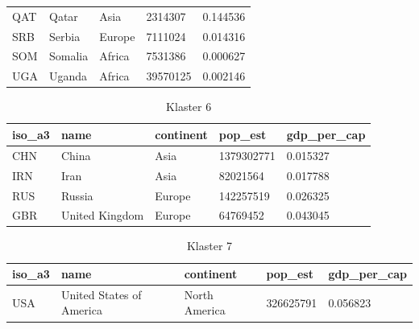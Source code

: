 \documentclass[11pt]{report}
\begin{document}
\begin{table}[]
\begin{tabular}{lllll}
            QAT                           & Qatar                     & Asia                           & 2314307                       & 0.144536                           \\
            SRB                           & Serbia                    & Europe                         & 7111024                       & 0.014316                           \\
            SOM                           & Somalia                   & Africa                         & 7531386                       & 0.000627                           \\
            UGA                           & Uganda                    & Africa                         & 39570125                      & 0.002146
        \end{tabular}
    \end{table}

    \begin{table}[]
        \caption {Klaster 6} \label{tab:cl6}
        \begin{tabular}{lllll}
            \hline
            \multicolumn{1}{|l|}{iso\_a3} & \multicolumn{1}{l|}{name} & \multicolumn{1}{l|}{continent} & \multicolumn{1}{l|}{pop\_est} & \multicolumn{1}{l|}{gdp\_per\_cap} \\ \hline
            CHN                           & China                     & Asia                           & 1379302771                    & 0.015327                           \\
            IRN                           & Iran                      & Asia                           & 82021564                      & 0.017788                           \\
            RUS                           & Russia                    & Europe                         & 142257519                     & 0.026325                           \\
            GBR                           & United Kingdom            & Europe                         & 64769452                      & 0.043045
        \end{tabular}
    \end{table}

    \begin{table}[]
        \caption {Klaster 7} \label{tab:cl7}
        \begin{tabular}{lllll}
            \hline
            \multicolumn{1}{|l|}{iso\_a3} & \multicolumn{1}{l|}{name} & \multicolumn{1}{l|}{continent} & \multicolumn{1}{l|}{pop\_est} & \multicolumn{1}{l|}{gdp\_per\_cap} \\ \hline
            USA                           & United States of America  & North America                  & 326625791                     & 0.056823
        \end{tabular}
    \end{table}
\end{document}
